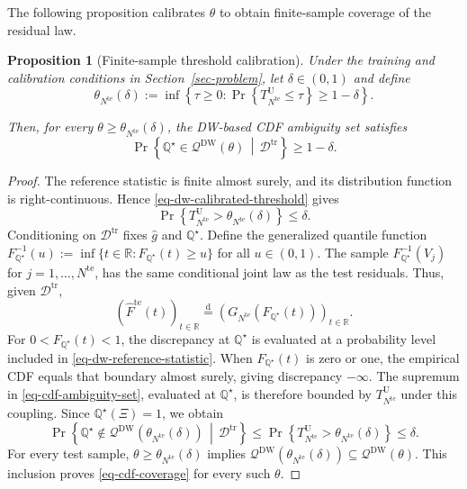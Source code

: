 \documentclass[review,11pt,3p,authoryear,nopreprintline]{elsarticle}
\newtheorem{proposition}{Proposition}
\begin{document}
The following proposition calibrates $\theta$ to obtain finite-sample coverage of the residual law.

\begin{proposition}[Finite-sample threshold calibration]
  \label{proposition-01}
  Under the training and calibration conditions in Section~\ref{sec-problem}, let $\delta\in(0,1)$ and define
  \begin{equation}
    \theta_{N^{\mathrm{te}}}(\delta):=\inf\left\{\tau\ge0:\Pr\left\{T_{N^{\mathrm{te}}}^{\mathrm U}\le\tau\right\}\ge1-\delta\right\}.
    \label{eq-dw-calibrated-threshold}
  \end{equation}

  Then, for every $\theta\ge\theta_{N^{\mathrm{te}}}(\delta)$, the DW-based CDF ambiguity set satisfies
  \begin{equation}
    \Pr\left\{\mathbb Q^\star\in\mathcal Q^{\mathrm{DW}}(\theta)\,\middle|\,\mathcal D^{\mathrm{tr}}\right\}\ge1-\delta.
    \label{eq-cdf-coverage}
  \end{equation}
\end{proposition}
\begin{proof}
  The reference statistic is finite almost surely, and its distribution function is right-continuous. Hence \eqref{eq-dw-calibrated-threshold} gives
  \[
    \Pr\left\{T_{N^{\mathrm{te}}}^{\mathrm U}>\theta_{N^{\mathrm{te}}}(\delta)\right\}\le\delta.
  \]
  Conditioning on $\mathcal D^{\mathrm{tr}}$ fixes $\hat g$ and $\mathbb Q^\star$. Define the generalized quantile function $F_{\mathbb Q^\star}^{-1}(u):=\inf\{t\in\mathbb R:F_{\mathbb Q^\star}(t)\ge u\}$ for all $u\in(0,1)$. The sample $F_{\mathbb Q^\star}^{-1}(V_j)$ for $j=1,\ldots,N^{\mathrm{te}}$, has the same conditional joint law as the test residuals. Thus, given $\mathcal D^{\mathrm{tr}}$,
  \[
    \left(\widehat F^{\mathrm{te}}(t)\right)_{t\in\mathbb R}\overset{\mathrm d}{=}\left(G_{N^{\mathrm{te}}}\!\left(F_{\mathbb Q^\star}(t)\right)\right)_{t\in\mathbb R}.
  \]
  For $0<F_{\mathbb Q^\star}(t)<1$, the discrepancy at $\mathbb Q^\star$ is evaluated at a probability level included in \eqref{eq-dw-reference-statistic}. When $F_{\mathbb Q^\star}(t)$ is zero or one, the empirical CDF equals that boundary almost surely, giving discrepancy $-\infty$. The supremum in \eqref{eq-cdf-ambiguity-set}, evaluated at $\mathbb Q^\star$, is therefore bounded by $T_{N^{\mathrm{te}}}^{\mathrm U}$ under this coupling. Since $\mathbb Q^\star(\Xi)=1$, we obtain
  \[
    \Pr\left\{\mathbb Q^\star\notin\mathcal Q^{\mathrm{DW}}\!\left(\theta_{N^{\mathrm{te}}}(\delta)\right)\,\middle|\,\mathcal D^{\mathrm{tr}}\right\}
    \le\Pr\left\{T_{N^{\mathrm{te}}}^{\mathrm U}>\theta_{N^{\mathrm{te}}}(\delta)\right\}\le\delta.
  \]
  For every test sample, $\theta\ge\theta_{N^{\mathrm{te}}}(\delta)$ implies $\mathcal Q^{\mathrm{DW}}\!\left(\theta_{N^{\mathrm{te}}}(\delta)\right)\subseteq\mathcal Q^{\mathrm{DW}}(\theta)$. This inclusion proves \eqref{eq-cdf-coverage} for every such $\theta$.
\end{proof}
\end{document}
